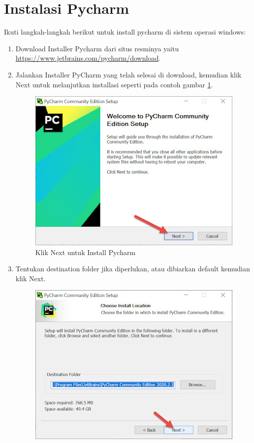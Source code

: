 \section{Instalasi Pycharm}
Ikuti langkah-langkah berikut untuk install pycharm di sistem operasi windows:
\begin{enumerate}
\item Download Installer Pycharm dari situs resminya yaitu \\  \url{https://www.jetbrains.com/pycharm/download}.
\item Jalankan Installer PyCharm yang telah selesai di download, kemudian klik Next untuk melanjutkan installasi seperti pada contoh gambar \ref{installpycharm}.
\begin{figure}[H]
\centering
\includegraphics[scale=.65]{figures/install_pycharm1}
\caption{Klik Next untuk Install Pycharm}
\label{installpycharm}
\end{figure}
\item Tentukan destination folder jika diperlukan, atau dibiarkan default kemudian klik Next.
\begin{figure}[H]
\centering
\includegraphics[scale=.65]{figures/install_pycharm2}

\end{figure}
\end{enumerate}
